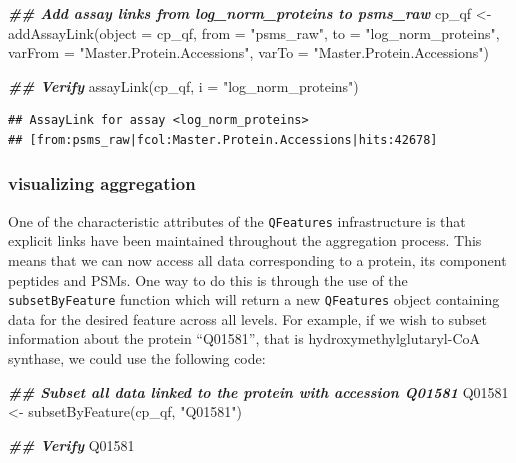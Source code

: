 \documentclass[9pt,a4paper,]{extarticle}
\newenvironment{Shaded}{\begin{snugshade}}{\end{snugshade}}
\newcommand{\AttributeTok}[1]{\textcolor[rgb]{0.77,0.63,0.00}{#1}}
\newcommand{\DocumentationTok}[1]{\textcolor[rgb]{0.56,0.35,0.01}{\textbf{\textit{#1}}}}
\newcommand{\FunctionTok}[1]{\textcolor[rgb]{0.00,0.00,0.00}{#1}}
\newcommand{\NormalTok}[1]{#1}
\newcommand{\OtherTok}[1]{\textcolor[rgb]{0.56,0.35,0.01}{#1}}
\newcommand{\StringTok}[1]{\textcolor[rgb]{0.31,0.60,0.02}{#1}}
\begin{document}
\begin{Shaded}
\begin{Highlighting}[]
\DocumentationTok{\#\# Add assay links from log\_norm\_proteins to psms\_raw}
\NormalTok{cp\_qf }\OtherTok{\textless{}{-}} \FunctionTok{addAssayLink}\NormalTok{(}\AttributeTok{object =}\NormalTok{ cp\_qf, }
                      \AttributeTok{from =} \StringTok{"psms\_raw"}\NormalTok{,}
                      \AttributeTok{to =} \StringTok{"log\_norm\_proteins"}\NormalTok{,}
                      \AttributeTok{varFrom =} \StringTok{"Master.Protein.Accessions"}\NormalTok{,}
                      \AttributeTok{varTo =} \StringTok{"Master.Protein.Accessions"}\NormalTok{)}

\DocumentationTok{\#\# Verify}
\FunctionTok{assayLink}\NormalTok{(cp\_qf, }
          \AttributeTok{i =} \StringTok{"log\_norm\_proteins"}\NormalTok{)}
\end{Highlighting}
\end{Shaded}

\begin{verbatim}
## AssayLink for assay <log_norm_proteins>
## [from:psms_raw|fcol:Master.Protein.Accessions|hits:42678]
\end{verbatim}

\hypertarget{visualizing-aggregation}{%
\subsubsection{visualizing aggregation}\label{visualizing-aggregation}}

One of the characteristic attributes of the \texttt{QFeatures} infrastructure is that
explicit links have been maintained throughout the aggregation process. This
means that we can now access all data corresponding to a protein, its component
peptides and PSMs. One way to do this is through the use of the
\texttt{subsetByFeature} function which will return a new \texttt{QFeatures} object containing
data for the desired feature across all levels. For example, if we wish to
subset information about the protein ``Q01581'', that is hydroxymethylglutaryl-CoA
synthase, we could use the following code:

\begin{Shaded}
\begin{Highlighting}[]
\DocumentationTok{\#\# Subset all data linked to the protein with accession Q01581}
\NormalTok{Q01581 }\OtherTok{\textless{}{-}} \FunctionTok{subsetByFeature}\NormalTok{(cp\_qf, }\StringTok{"Q01581"}\NormalTok{)}

\DocumentationTok{\#\# Verify}
\NormalTok{Q01581}
\end{Highlighting}
\end{Shaded}
\end{document}
